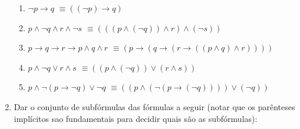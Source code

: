 \documentclass[12pt,a4paper,oneside]{article}
\begin{document}
\begin{enumerate}
		\begin{enumerate}
			\item $\neg p \rightarrow q$ {\color{verde} $\equiv ((\neg p) \rightarrow q)$}
			\item $p \wedge \neg q \wedge r \wedge \neg s$ 
			      {\color{verde} $\equiv (((p \wedge (\neg q)) \wedge r) \wedge (\neg s))$}
			\item $p \rightarrow q \rightarrow r \rightarrow p \wedge q \wedge r$ 
			      {\color{verde} $\equiv (p \rightarrow (q \rightarrow (r \rightarrow ((p \wedge q) \wedge r))))$}
			\item $p \wedge \neg q \vee r \wedge s$ 
			      {\color{verde} $\equiv ((p \wedge (\neg q)) \vee (r \wedge s))$}
			\item $p \wedge \neg (p \rightarrow \neg q) \vee \neg q$ 
			      {\color{verde} $\equiv ((p \wedge (\neg (p \rightarrow (\neg q)))) \vee (\neg q))$}
		\end{enumerate}
	
	\item Dar o conjunto de subfórmulas das fórmulas a seguir (notar que os parênteses implícitos sao fundamentais para decidir quais são as subfórmulas):	
	

\end{enumerate}
\end{document}

